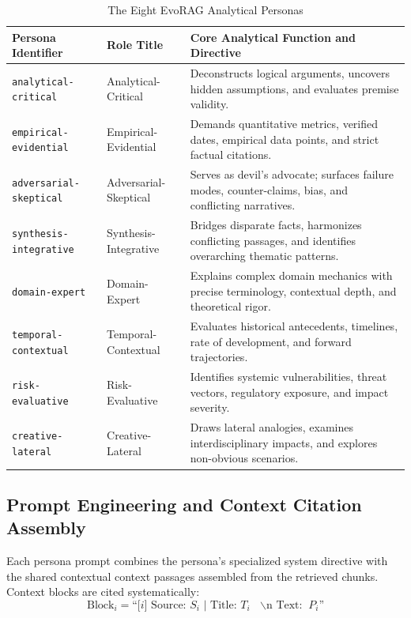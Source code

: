 \begin{table}[H]
\centering
\caption{The Eight EvoRAG Analytical Personas}
\label{tab:personas}
\small
\renewcommand{\arraystretch}{1.3}
\begin{tabularx}{\linewidth}{|l|p{3.8cm}|X|}
\hline
\textbf{Persona Identifier} & \textbf{Role Title} & \textbf{Core Analytical Function and Directive} \\
\hline
\texttt{analytical-critical} & Analytical-Critical & Deconstructs logical arguments, uncovers hidden assumptions, and evaluates premise validity. \\
\hline
\texttt{empirical-evidential} & Empirical-Evidential & Demands quantitative metrics, verified dates, empirical data points, and strict factual citations. \\
\hline
\texttt{adversarial-skeptical} & Adversarial-Skeptical & Serves as devil's advocate; surfaces failure modes, counter-claims, bias, and conflicting narratives. \\
\hline
\texttt{synthesis-integrative} & Synthesis-Integrative & Bridges disparate facts, harmonizes conflicting passages, and identifies overarching thematic patterns. \\
\hline
\texttt{domain-expert} & Domain-Expert & Explains complex domain mechanics with precise terminology, contextual depth, and theoretical rigor. \\
\hline
\texttt{temporal-contextual} & Temporal-Contextual & Evaluates historical antecedents, timelines, rate of development, and forward trajectories. \\
\hline
\texttt{risk-evaluative} & Risk-Evaluative & Identifies systemic vulnerabilities, threat vectors, regulatory exposure, and impact severity. \\
\hline
\texttt{creative-lateral} & Creative-Lateral & Draws lateral analogies, examines interdisciplinary impacts, and explores non-obvious scenarios. \\
\hline
\end{tabularx}
\end{table}

\subsection{Prompt Engineering and Context Citation Assembly}
Each persona prompt combines the persona's specialized system directive with the shared contextual context passages assembled from the retrieved chunks. Context blocks are cited systematically:
\begin{equation}
\label{eq:context_block}
\text{Block}_i = \text{``[}i\text{] Source: } S_i \text{ | Title: } T_i \text{ $\backslash$n Text: } P_i\text{''}
\end{equation}

